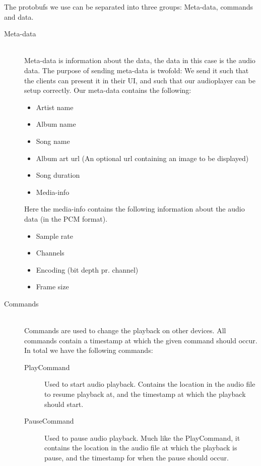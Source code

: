 The protobufs we use can be separated into three groups: Meta-data, commands and data. 
\begin{description}
    \item[Meta-data] \hfill \\
        Meta-data is information about the data, the data in this case is the audio data.
        The purpose of sending meta-data is twofold: We send it such that the clients can present it in their UI, and such that our audioplayer can be setup correctly.
        Our meta-data contains the following:
        \begin{itemize}
            \item Artist name
            \item Album name
            \item Song name
            \item Album art url (An optional url containing an image to be displayed)
            \item Song duration
            \item Media-info
        \end{itemize}
        Here the media-info contains the following information about the audio data (in the PCM format). 
        \begin{itemize}
            \item Sample rate
            \item Channels
            \item Encoding (bit depth pr. channel)
            \item Frame size
        \end{itemize}
    \item[Commands] \hfill \\
        Commands are used to change the playback on other devices.
        All commands contain a timestamp at which the given command should occur. 
        In total we have the following commands:
        \begin{description}
            \item[PlayCommand]
                Used to start audio playback.
                Contains the location in the audio file to resume playback at, and the timestamp at which the playback should start.
            \item[PauseCommand]
                Used to pause audio playback.
                Much like the PlayCommand, it contains the location in the audio file at which the playback is pause, and the timestamp for when the pause should occur.

\end{description}
\end{description}
